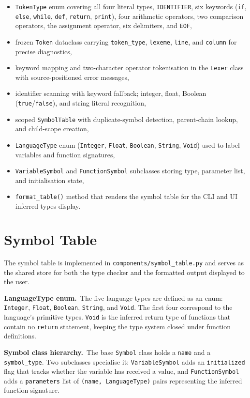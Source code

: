 \begin{itemize}
    \item \texttt{TokenType} enum covering all four literal types, \texttt{IDENTIFIER}, six keywords (\texttt{if}, \texttt{else}, \texttt{while}, \texttt{def}, \texttt{return}, \texttt{print}), four arithmetic operators, two comparison operators, the assignment operator, six delimiters, and \texttt{EOF},
    \item frozen \texttt{Token} dataclass carrying \texttt{token\_type}, \texttt{lexeme}, \texttt{line}, and \texttt{column} for precise diagnostics,
    \item keyword mapping and two-character operator tokenisation in the \texttt{Lexer} class with source-positioned error messages,
    \item identifier scanning with keyword fallback; integer, float, Boolean (\texttt{true}/\texttt{false}), and string literal recognition,
    \item scoped \texttt{SymbolTable} with duplicate-symbol detection, parent-chain lookup, and child-scope creation,
    \item \texttt{LanguageType} enum (\texttt{Integer}, \texttt{Float}, \texttt{Boolean}, \texttt{String}, \texttt{Void}) used to label variables and function signatures,
    \item \texttt{VariableSymbol} and \texttt{FunctionSymbol} subclasses storing type, parameter list, and initialisation state,
    \item \texttt{format\_table()} method that renders the symbol table for the CLI and UI inferred-types display.
\end{itemize}

\section{Symbol Table}
The symbol table is implemented in \texttt{components/symbol\_table.py} and
serves as the shared store for both the type checker and the formatted output
displayed to the user.

\textbf{LanguageType enum.}\ The five language types are defined as an enum:
\texttt{Integer}, \texttt{Float}, \texttt{Boolean}, \texttt{String}, and
\texttt{Void}. The first four correspond to the language's primitive types.
\texttt{Void} is the inferred return type of functions that contain no
\texttt{return} statement, keeping the type system closed under function
definitions.

\textbf{Symbol class hierarchy.}\ The base \texttt{Symbol} class holds a
\texttt{name} and a \texttt{symbol\_type}. Two subclasses specialise it:
\texttt{VariableSymbol} adds an \texttt{initialized} flag that tracks whether
the variable has received a value, and \texttt{FunctionSymbol} adds a
\texttt{parameters} list of \texttt{(name, LanguageType)} pairs representing
the inferred function signature.

